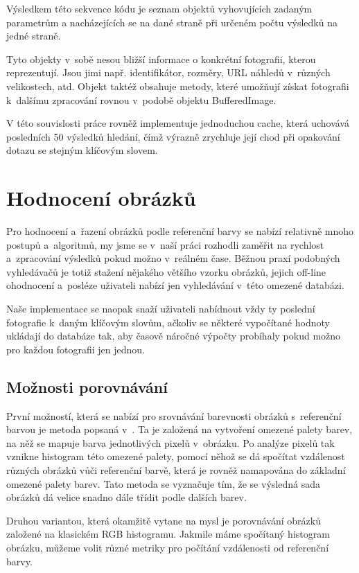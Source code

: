 \documentclass[12pt,oneside,a4paper]{article}
\begin{document}
Výsledkem této sekvence kódu je seznam objektů vyhovujících zadaným parametrům a nacházejících se na dané straně při určeném počtu výsledků na jedné straně.

Tyto objekty v~sobě nesou bližší informace o konkrétní fotografii, kterou reprezentují. Jsou jimi např. identifikátor, rozměry, URL náhledů v~různých velikostech, atd. Objekt taktéž obsahuje metody, které umožňují získat fotografii k~dalšímu zpracování rovnou v~podobě objektu BufferedImage.

V této souvislosti práce rovněž implementuje jednoduchou cache, která uchovává posledních 50 výsledků hledání, čímž výrazně zrychluje její chod při opakování dotazu se stejným klíčovým slovem.

\section{Hodnocení obrázků}
Pro hodnocení a~řazení obrázků podle referenční barvy se nabízí relativně mnoho postupů a~algoritmů, my jsme se v~naší práci rozhodli zaměřit na rychlost a~zpracování výsledků pokud možno v~reálném čase. Běžnou praxí podobných vyhledávačů je totiž stažení nějakého většího vzorku obrázků, jejich off-line ohodnocení a~posléze uživateli nabízí jen vyhledávání v~této omezené databázi.

Naše implementace se naopak snaží uživateli nabídnout vždy ty poslední fotografie k~daným klíčovým slovům, ačkoliv se některé vypočítané hodnoty ukládají do databáze tak, aby časově náročné výpočty probíhaly pokud možno pro každou fotografii jen jednou.

\subsection{Možnosti porovnávání}
První možností, která se nabízí pro srovnávání barevnosti obrázků s~referenční barvou je metoda popsaná v~\cite{Mueller2k9}. Ta je založená na vytvoření omezené palety barev, na něž se mapuje barva jednotlivých pixelů v~obrázku. Po analýze pixelů tak vznikne histogram této omezené palety, pomocí něhož se dá spočítat vzdálenost různých obrázků vůči referenční barvě, která je rovněž namapována do základní omezené palety barev. Tato metoda se vyznačuje tím, že se výsledná sada obrázků dá velice snadno dále třídit podle dalších barev.

Druhou variantou, která okamžitě vytane na mysl je porovnávání obrázků založené na klasickém RGB histogramu. Jakmile máme spočítaný histogram obrázku, můžeme volit různé metriky pro počítání vzdálenosti od referenční barvy.
\end{document}
